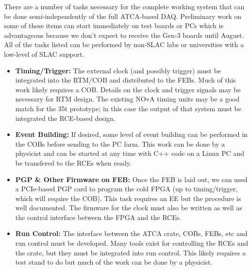 There are a number of tasks necessary for the complete working system that can be done semi-independently of the full ATCA-based DAQ.  Preliminary work on some of these items can start immediately on test boards or PCs which is advantageous because we don't expect to receive the Gen-3 boards until August.  All of the tasks listed can be performed by non-SLAC labs or universities with a low-level of SLAC support.  
\begin{itemize}
\item \textbf{Timing/Trigger:  }The external clock (and possibly trigger) must be integrated into the RTM/COB and distributed to the FEBs.  Much of this work likely requires a COB.  Details on the clock and trigger signals may be necessary for RTM design.   The existing NOvA timing units may be a good match for the 35t prototype; in this case the output of that system must be integrated the RCE-based design.  
\item \textbf{Event Building:  }If desired, some level of event building can be performed in the COBs before sending to the PC farm.  This work can be done by a physicist and can be started at any time with C++ code on a Linux PC and be transfered to the RCEs when ready.   
\item \textbf{PGP \& Other Firmware on FEB:   } Once the FEB is laid out,  we can used a PCIe-based PGP card to program  the cold FPGA (up to timing/trigger, which will require the COB).  This task requires an EE but the procedure is well documented.  The firmware for the clock must also be written as well as the control interface between the FPGA and the RCEs.  
\item \textbf{Run Control:  }  The interface between the ATCA crate, COBs, FEBs, etc and run control must be developed. Many tools exist for controlling the RCEs and the crate, but they must be integrated into run control.  This likely requires a test stand to do but much of the work can be done by a physicist.  
\end{itemize}


